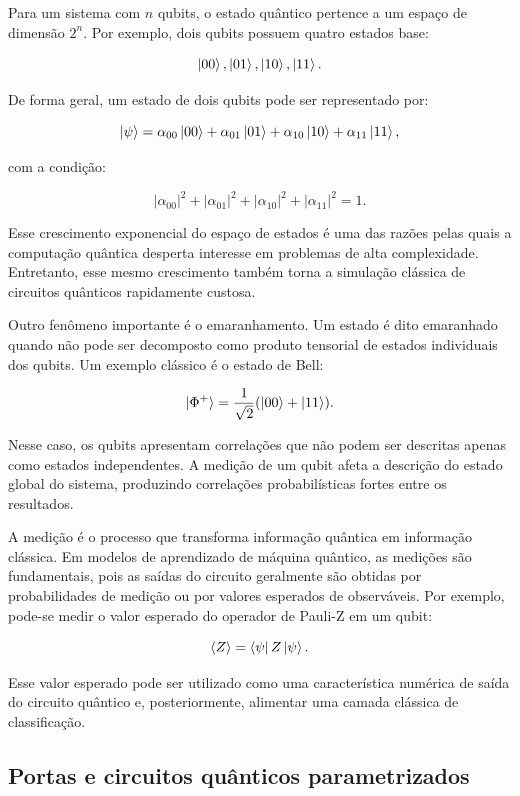 \documentclass[
    12pt,
    openright,
    oneside,
    a4paper,
    english,
    brazil
]{abntex2}
\begin{document}
Para um sistema com \(n\) qubits, o estado quântico pertence a um espaço de dimensão \(2^n\). Por exemplo, dois qubits possuem quatro estados base:

\[
\ket{00}, \ket{01}, \ket{10}, \ket{11}.
\]

De forma geral, um estado de dois qubits pode ser representado por:

\[
\ket{\psi} =
\alpha_{00}\ket{00}
+
\alpha_{01}\ket{01}
+
\alpha_{10}\ket{10}
+
\alpha_{11}\ket{11},
\]

com a condição:

\[
|\alpha_{00}|^2 +
|\alpha_{01}|^2 +
|\alpha_{10}|^2 +
|\alpha_{11}|^2 = 1.
\]

Esse crescimento exponencial do espaço de estados é uma das razões pelas quais a computação quântica desperta interesse em problemas de alta complexidade. Entretanto, esse mesmo crescimento também torna a simulação clássica de circuitos quânticos rapidamente custosa.

Outro fenômeno importante é o emaranhamento. Um estado é dito emaranhado quando não pode ser decomposto como produto tensorial de estados individuais dos qubits. Um exemplo clássico é o estado de Bell:

\[
\ket{\Phi^+} =
\frac{1}{\sqrt{2}}
(\ket{00} + \ket{11}).
\]

Nesse caso, os qubits apresentam correlações que não podem ser descritas apenas como estados independentes. A medição de um qubit afeta a descrição do estado global do sistema, produzindo correlações probabilísticas fortes entre os resultados.

A medição é o processo que transforma informação quântica em informação clássica. Em modelos de aprendizado de máquina quântico, as medições são fundamentais, pois as saídas do circuito geralmente são obtidas por probabilidades de medição ou por valores esperados de observáveis. Por exemplo, pode-se medir o valor esperado do operador de Pauli-Z em um qubit:

\[
\langle Z \rangle =
\bra{\psi} Z \ket{\psi}.
\]

Esse valor esperado pode ser utilizado como uma característica numérica de saída do circuito quântico e, posteriormente, alimentar uma camada clássica de classificação.

\subsection{Portas e circuitos quânticos parametrizados}
\end{document}
